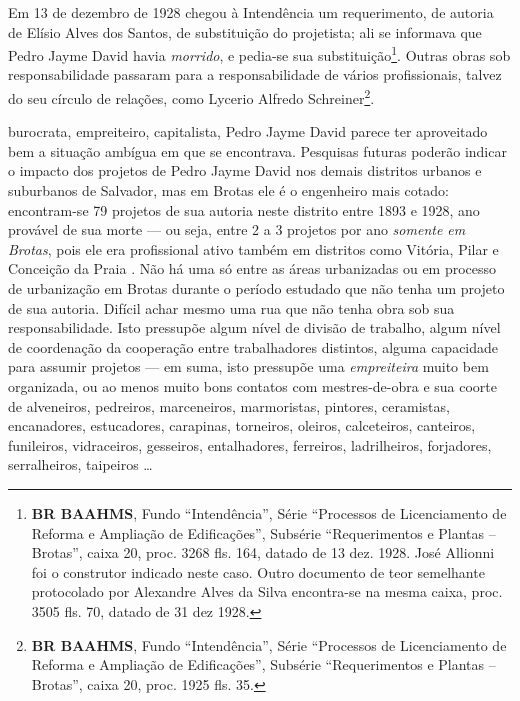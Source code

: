 Em 13 de dezembro de 1928 chegou à Intendência um requerimento, de autoria de Elísio Alves dos Santos, de substituição do projetista; ali se informava que Pedro Jayme David havia \textit{morrido}, e pedia-se sua substituição\footnote{\textbf{BR BAAHMS}, Fundo ``Intendência'', Série ``Processos de Licenciamento de Reforma e Ampliação de Edificações'', Subsérie ``Requerimentos e Plantas – Brotas'', caixa 20, proc. 3268 fls. 164, datado de 13 dez. 1928. José Allionni foi o construtor indicado neste caso. Outro documento de teor semelhante protocolado por Alexandre Alves da Silva encontra-se na mesma caixa, proc. 3505 fls. 70, datado de 31 dez 1928.}. Outras obras sob responsabilidade passaram para a responsabilidade de vários profissionais, talvez do seu círculo de relações, como Lycerio Alfredo Schreiner\footnote{\textbf{BR BAAHMS}, Fundo ``Intendência'', Série ``Processos de Licenciamento de Reforma e Ampliação de Edificações'', Subsérie ``Requerimentos e Plantas – Brotas'', caixa 20, proc. 1925 fls. 35.}.

burocrata, empreiteiro, capitalista, Pedro Jayme David parece ter aproveitado bem a situação ambígua em que se encontrava. Pesquisas futuras poderão indicar o impacto dos projetos de Pedro Jayme David nos demais distritos urbanos e suburbanos de Salvador, mas em Brotas ele é o engenheiro mais cotado: encontram-se 79 projetos de sua autoria neste distrito entre 1893 e 1928, ano provável de sua morte --- ou seja, entre 2 a 3 projetos por ano \textit{somente em Brotas}, pois ele era profissional ativo também em distritos como Vitória, Pilar e Conceição da Praia \cite{almeida_victoria_1997, almeida_vitrinescomercio_2014}. Não há uma só entre as áreas urbanizadas ou em processo de urbanização em Brotas durante o período estudado que não tenha um projeto de sua autoria. Difícil achar mesmo uma rua que não tenha obra sob sua responsabilidade. Isto pressupõe algum nível de divisão de trabalho, algum nível de coordenação da cooperação entre trabalhadores distintos, alguma capacidade para assumir projetos --- em suma, isto pressupõe uma \textit{empreiteira} muito bem organizada, ou ao menos muito bons contatos com mestres-de-obra e sua coorte de alveneiros, pedreiros, marceneiros, marmoristas, pintores, ceramistas, encanadores, estucadores, carapinas, torneiros, oleiros, calceteiros, canteiros, funileiros, vidraceiros, gesseiros, entalhadores, ferreiros, ladrilheiros,  forjadores, serralheiros, taipeiros \dots

